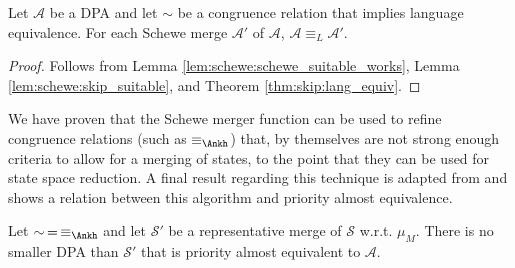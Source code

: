 \begin{cor}
	Let $\mathcal{A}$ be a DPA and let $\sim$ be a congruence relation that implies language equivalence. For each Schewe merge $\mathcal{A}'$ of $\mathcal{A}$, $\mathcal{A} \equiv_L \mathcal{A}'$.
\end{cor}

\begin{proof}
	Follows from Lemma \ref{lem:schewe:schewe_suitable_works}, Lemma \ref{lem:schewe:skip_suitable}, and Theorem \ref{thm:skip:lang_equiv}.
\end{proof}



\newpage


We have proven that the Schewe merger function can be used to refine congruence relations (such as $\equiv_\text{\Ankh}$) that, by themselves are not strong enough criteria to allow for a merging of states, to the point that they can be used for state space reduction. A final result regarding this technique is adapted from \cite{Schewe2010} and shows a relation between this algorithm and priority almost equivalence.

\begin{lem}
	Let $\sim \,=\, \equiv_\text{\Ankh}$ and let $\mathcal{S}'$ be a representative merge of $\mathcal{S}$ w.r.t. $\mu_M$. There is no smaller DPA than $\mathcal{S}'$ that is priority almost equivalent to $\mathcal{A}$.
\end{lem} 

